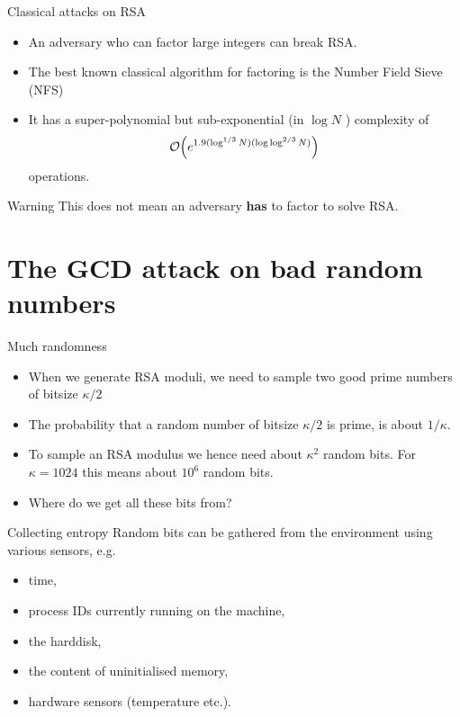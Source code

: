 \documentclass[presentation,smaller]{beamer}
\begin{document}
\begin{frame}[label={sec:orge96d1e6}]{Classical attacks on RSA}
\begin{itemize}
\item An adversary who can factor large integers can break RSA.

\item The best known classical algorithm for factoring is the Number Field Sieve (NFS)

\item It has a \alert{super-polynomial} but \alert{sub-exponential} (in \(\log N\) ) complexity of \[\bigO{e^{1.9 (\log^{1/3} N) (\log\log^{2/3} N)}}\] operations.
\end{itemize}


\pause

\begin{block}{Warning}
This does not mean an adversary \textbf{has} to factor to solve RSA.
\end{block}
\end{frame}

\section{The GCD attack on bad random numbers}
\label{sec:org7703e79}
\begin{frame}[label={sec:org5ee5f72}]{Much randomness}
\begin{itemize}
\item When we generate RSA moduli, we need to sample two good prime numbers of bitsize \(κ/2\)
\item The probability that a random number of bitsize \(κ/2\) is prime, is about \(1/κ\).
\item To sample an RSA modulus we hence need about \(κ^2\) random bits. For \(κ = 1024\) this means about \(10^6\) random bits.
\item Where do we get all these bits from?
\end{itemize}
\end{frame}

\begin{frame}[label={sec:org19350d4}]{Collecting entropy}
Random bits can be gathered from the environment using various sensors, e.g.

\begin{itemize}
\item time,
\item process IDs currently running on the machine,
\item the harddisk,
\item the content of uninitialised memory,
\item hardware sensors (temperature etc.).
\end{itemize}
\end{frame}
\end{document}
